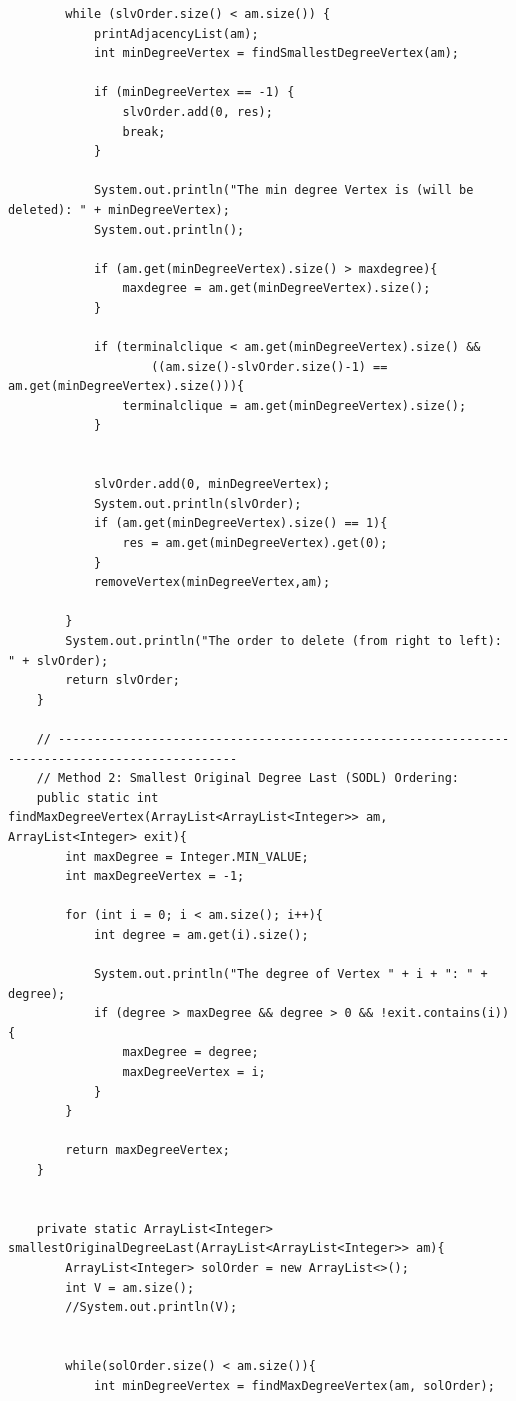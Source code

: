 \documentclass{article}
\begin{document}
\begin{verbatim}
        while (slvOrder.size() < am.size()) {
            printAdjacencyList(am);
            int minDegreeVertex = findSmallestDegreeVertex(am);

            if (minDegreeVertex == -1) {
                slvOrder.add(0, res);
                break;
            }

            System.out.println("The min degree Vertex is (will be deleted): " + minDegreeVertex);
            System.out.println();

            if (am.get(minDegreeVertex).size() > maxdegree){
                maxdegree = am.get(minDegreeVertex).size();
            }

            if (terminalclique < am.get(minDegreeVertex).size() &&
                    ((am.size()-slvOrder.size()-1) == am.get(minDegreeVertex).size())){
                terminalclique = am.get(minDegreeVertex).size();
            }


            slvOrder.add(0, minDegreeVertex);
            System.out.println(slvOrder);
            if (am.get(minDegreeVertex).size() == 1){
                res = am.get(minDegreeVertex).get(0);
            }
            removeVertex(minDegreeVertex,am);

        }
        System.out.println("The order to delete (from right to left): " + slvOrder);
        return slvOrder;
    }

    // -----------------------------------------------------------------------------------------------
    // Method 2: Smallest Original Degree Last (SODL) Ordering:
    public static int findMaxDegreeVertex(ArrayList<ArrayList<Integer>> am, ArrayList<Integer> exit){
        int maxDegree = Integer.MIN_VALUE;
        int maxDegreeVertex = -1;

        for (int i = 0; i < am.size(); i++){
            int degree = am.get(i).size();

            System.out.println("The degree of Vertex " + i + ": " + degree);
            if (degree > maxDegree && degree > 0 && !exit.contains(i)){
                maxDegree = degree;
                maxDegreeVertex = i;
            }
        }

        return maxDegreeVertex;
    }


    private static ArrayList<Integer> smallestOriginalDegreeLast(ArrayList<ArrayList<Integer>> am){
        ArrayList<Integer> solOrder = new ArrayList<>();
        int V = am.size();
        //System.out.println(V);


        while(solOrder.size() < am.size()){
            int minDegreeVertex = findMaxDegreeVertex(am, solOrder);


\end{verbatim}
\end{document}
